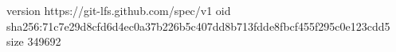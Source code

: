 version https://git-lfs.github.com/spec/v1
oid sha256:71c7e29d8cfd6d4ec0a37b226b5c407dd8b713fdde8fbcf455f295c0e123cdd5
size 349692
